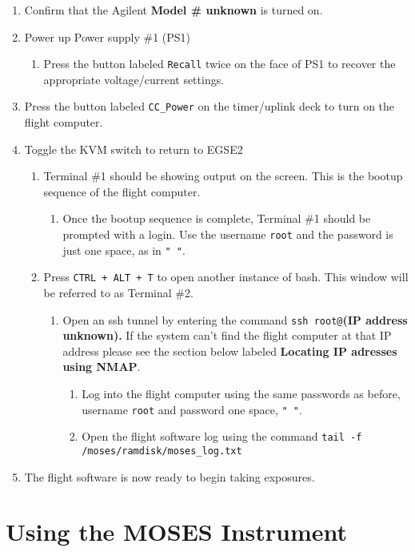 \documentclass[10pt,a4paper,titlepage]{article}
\begin{document}
\begin{enumerate}
\begin{enumerate}
	\end{enumerate}
	\item Confirm that the Agilent \textbf{Model \# unknown} is turned on.
	\item Power up Power supply \#1 (PS1)
	\begin{enumerate}
		\item Press the button labeled \texttt{Recall} twice on the face of PS1 to recover the appropriate voltage/current settings.
	\end{enumerate}
	\item Press the button labeled \texttt{CC\_Power} on the timer/uplink deck to turn on the flight computer.
	\item Toggle the KVM switch to return to EGSE2
	\begin{enumerate}
		\item Terminal \#1 should be showing output on the screen. This is the bootup sequence of the flight computer.
		\begin{enumerate}
			\item Once the bootup sequence is complete, Terminal \#1 should be prompted with a login. Use the username \texttt{root} and the password is just one space, as in \texttt{" "}.
		\end{enumerate}
		\item Press \texttt{CTRL + ALT + T} to open another instance of bash. This window will be referred to as Terminal \#2.
		\begin{enumerate}
			\item Open an ssh tunnel by entering the command \texttt{ssh root@}\textbf{(IP address unknown).} If the system can't find the flight computer at that IP address please see the section below labeled \textbf{Locating IP adresses using NMAP}.
			\begin{enumerate}
				\item Log into the flight computer using the same passwords as before, username \texttt{root} and password one space, \texttt{" "}.
				\item Open the flight software log using the command \texttt{tail -f /moses/ramdisk/moses\_log.txt}
			\end{enumerate}
		\end{enumerate}
	\end{enumerate}
	\item The flight software is now ready to begin taking exposures.
\end{enumerate}

\section{Using the MOSES Instrument}
\end{document}
